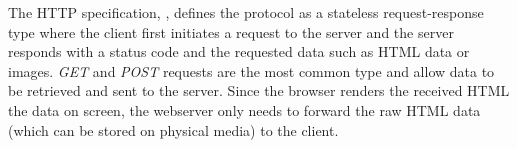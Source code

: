 The HTTP specification, \cite{rfc2616}, defines the protocol as a stateless request-response type where the client first initiates a request to the server and the server responds with a status code and the requested data such as HTML data or images. \textit{GET} and \textit{POST} requests are the most common type and allow data to be retrieved and sent to the server. Since the browser renders the received HTML the data on screen, the webserver only needs to forward the raw HTML data (which can be stored on physical media) to the client.

